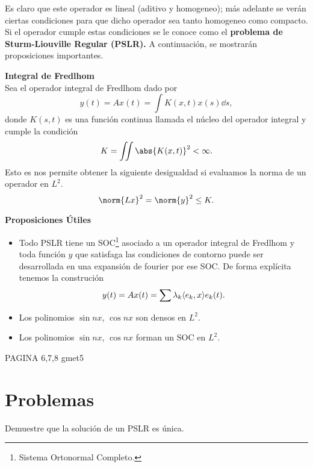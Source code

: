 Es claro que este operador es lineal (aditivo y homogeneo); más adelante se verán ciertas condiciones para que dicho operador sea tanto homogeneo como compacto. Si el operador cumple estas condiciones se le conoce como el \textbf{problema de Sturm-Liouville Regular (PSLR).} A continuación, se mostrarán proposiciones importantes.




\begin{mdframed}[style=warning]
	{\large \textbf{Integral de Fredlhom}} \\
	Sea el operador integral de Fredlhom dado por
		$$ y(t) = Ax(t) = \int K(x,t) x(s) \dd{s}, $$
	donde $K(s,t)$ es una función continua llamada el núcleo del operador integral y cumple la condición
		$$ K = \iint \abs{K(x,t)}^2 < \infty . $$
	Esto es nos permite obtener la siguiente desigualdad si evaluamos la norma de un operador en $L^2$.
		$$ \norm{Lx}^2 = \norm{y}^2 \leq K. $$
\end{mdframed}




\begin{mdframed}[style=warning]
	{\large \textbf{Proposiciones Útiles}} \\
	\begin{itemize}
		\item Todo PSLR tiene un SOC\footnote{Sistema Ortonormal Completo.} asociado a un operador integral de Fredlhom y toda función $y$ que satisfaga las condiciones de contorno puede ser desarrollada en una expansión de fourier por ese SOC. De forma explícita tenemos la construción
			$$ y(t) = Ax(t) = \sum \lambda _k \langle e_k , x \rangle e_k (t) . $$
		\item Los polinomios $\sin{nx}$, $\cos{nx}$ son densos en $L^2$.
		\item Los polinomios $\sin{nx}$, $\cos{nx}$ forman un SOC en $L^2$.
	\end{itemize}
\end{mdframed}

PAGINA 6,7,8 gmet5

\pagebreak


\section*{Problemas}



\begin{ejercicio}
	Demuestre que la solución de un PSLR es única.
\end{ejercicio}



















